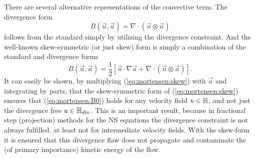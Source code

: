 There are several alternative representations of the convective term. The divergence form 
\begin{equation}
B(\vec{u},\vec{a})=\nabla \cdot (\vec{u} \otimes \vec{a})
\end{equation}
follows from the standard simply by utilizing the divergence constraint. And the well-known skew-symmetric (or just skew) form is simply a combination of the standard and divergence forms
\begin{equation}
 B(\vec{u},\vec{a}) = \frac{1}{2}\left[ \vec{u}\cdot \nabla \vec{a} + \nabla \cdot (\vec{u} \otimes \vec{a}) \right].
\label{eq:mortensen:skew}
\end{equation}
It can easily be shown, by multiplying (\eqref{eq:mortensen:skew}) with $\vec{a}$ and integrating by parts, that the skew-symmetric form of (\eqref{eq:mortensen:skew}) ensures that (\eqref{eq:mortensen:B0}) holds for any velocity field ${ u } \in \mathbb{H}$, and not just the divergence free ${ u } \in \mathbb{H}_{div}$. This is an important result, because in fractional step (projection) methods for the NS equations the divergence constraint is not always fulfilled, at least not for intermediate velocity fields. With the skew-form it is ensured that this divergence flaw does not propagate and contaminate the (of primary importance) kinetic energy of the flow.


